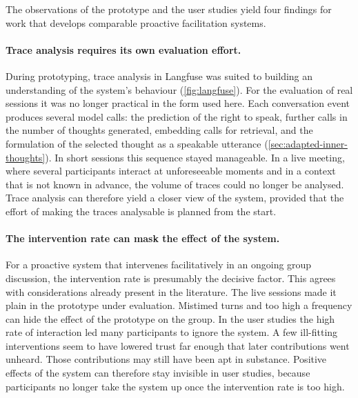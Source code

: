 The observations of the prototype and the user studies yield four findings for
work that develops comparable proactive facilitation systems.

\paragraph{Trace analysis requires its own evaluation effort.}
During prototyping, trace analysis in Langfuse was suited to building an
understanding of the system's behaviour
(\autoref{fig:langfuse}).
For the evaluation of real sessions it was no longer practical in the form
used here.
Each conversation event produces several model calls: the prediction of the
right to speak, further calls in the number of thoughts generated, embedding
calls for retrieval, and the formulation of the selected thought as a speakable
utterance
(\autoref{sec:adapted-inner-thoughts}).
In short sessions this sequence stayed manageable.
In a live meeting, where several participants interact at unforeseeable moments
and in a context that is not known in advance, the volume of traces could no
longer be analysed.
Trace analysis can therefore yield a closer view of the system, provided that
the effort of making the traces analysable is planned from the start.

\paragraph{The intervention rate can mask the effect of the system.}
For a proactive system that intervenes facilitatively in an ongoing group
discussion, the intervention rate is presumably the decisive factor.
This agrees with considerations already present in the literature.
The live sessions made it plain in the prototype under evaluation.
Mistimed turns and too high a frequency can hide the effect of the prototype
on the group.
In the user studies the high rate of interaction led many participants to
ignore the system.
A few ill-fitting interventions seem to have lowered trust far enough that
later contributions went unheard.
Those contributions may still have been apt in substance.
Positive effects of the system can therefore stay invisible in user studies,
because participants no longer take the system up once the intervention rate
is too high.

